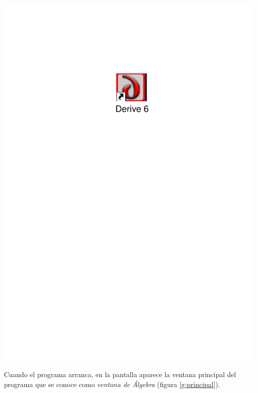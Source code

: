 \begin{center}
  \includegraphics[scale=0.4]{img/introduccion_derive/icono}
\end{center}

Cuando el programa arranca, en la pantalla aparece la ventana
principal del programa que se conoce como \emph{ventana de Álgebra}
(figura \ref{g:principal}).

